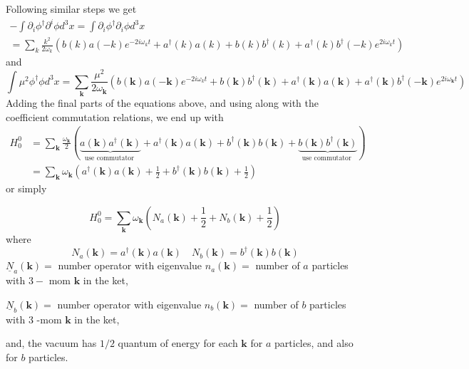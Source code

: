 Following similar steps we get
$$
\begin{array}{c}
     -\int \partial_{i} \phi^{\dagger} \partial^{i} \phi d^{3} x=\int \partial_{i} \phi^{\dagger} \partial_{i} \phi d^{3} x\\
     =\sum_{k} \frac{k^{2}}{2 \omega_{k}}\left(b(k) a(-k) e^{-2 i \omega_k t}+a^{\dagger}(k) a(k)+b(k) b^{\dagger}(k)+a^{\dagger}(k) b^{\dagger}(-k) e^{2i \omega_k t}\right)
\end{array}
$$
and
$$
\int \mu^{2} \phi^{\dagger} \phi d^{3} x=\sum_{\mathbf{k}} \frac{\mu^{2}}{2 \omega_{\mathbf{k}}}\left(b(\mathbf{k}) a(-\mathbf{k}) e^{-2 i\omega_kt}+b(\mathbf{k}) b^{\dagger}(\mathbf{k})+a^{\dagger}(\mathbf{k}) a(\mathbf{k})+a^{\dagger}(\mathbf{k}) b^{\dagger}(-\mathbf{k}) e^{2 i \omega_{\mathbf{k}} t}\right)
$$
Adding the final parts of the equations above, and using  along with the coefficient commutation relations, we end up with
\begin{equation}
\begin{aligned}
H_{0}^{0} &=\sum_{\mathbf{k}} \frac{\omega_{\mathbf{k}}}{2}\left(\underbrace{a(\mathbf{k}) a^{\dagger}(\mathbf{k})}_{\text {use commutator }}+a^{\dagger}(\mathbf{k}) a(\mathbf{k})+b^{\dagger}(\mathbf{k}) b(\mathbf{k})+\underbrace{b(\mathbf{k}) b^{\dagger}(\mathbf{k})}_{\text {use commutator }}\right) \\
&=\sum_{\mathbf{k}} \omega_{\mathbf{k}}\left(a^{\dagger}(\mathbf{k}) a(\mathbf{k})+\frac{1}{2}+b^{\dagger}(\mathbf{k}) b(\mathbf{k})+\frac{1}{2}\right)
\end{aligned}
\end{equation}
or simply
\begin{qt}
    \begin{equation}
H_{0}^{0}=\sum_{\mathbf{k}} \omega_{\mathbf{k}}\left(N_{a}(\mathbf{k})+\frac{1}{2}+N_{b}(\mathbf{k})+\frac{1}{2}\right)
\end{equation}
where
\begin{equation}
N_{a}(\mathbf{k})=a^{\dagger}(\mathbf{k}) a(\mathbf{k}) \quad N_{b}(\mathbf{k})=b^{\dagger}(\mathbf{k}) b(\mathbf{k})
\end{equation}
$\underline{N}_{a}(\mathbf{k})=$ number operator with eigenvalue $n_{a}(\mathbf{k})=$ number of $a$ particles with $3-$ mom $\mathbf{k}$ in the ket, 

$\underline{N}_{b}(\mathbf{k})=$ number operator with eigenvalue $n_{b}(\mathbf{k})=$ number of $b$ particles with 3 -mom $\mathbf{k}$ in the ket, 

and, the vacuum has $1 / 2$ quantum of energy for each $\mathbf{k}$ for $a$ particles, and also for $b$ particles.
\end{qt}
